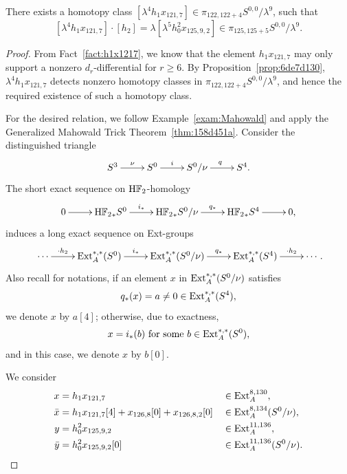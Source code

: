 \documentclass{amsart}
\numberwithin{equation}{section}
\newcommand{\HF}{\mathrm{H}\bF_2}
\begin{document}
\begin{lemma} \label{lem:nuext125}
    There exists a homotopy class $[\lambda^4 h_1 x_{121,7}] \in \pi_{122,122+4}S^{0,0}/\lambda^9$, such that 
    $$[\lambda^4 h_1 x_{121,7}] \cdot [h_2] = \lambda [\lambda^5 h_0^2 x_{125,9,2}] \in \pi_{125,125+5} S^{0,0}/\lambda^9.$$
\end{lemma}

\begin{proof}
    From Fact~\ref{fact:h1x1217}, we know that the element $h_1x_{121,7}$ may only support a nonzero $d_r$-differential for $r \ge 6$. By Proposition~\ref{prop:6de7d130}, $\lambda^4 h_1 x_{121,7}$ detects nonzero homotopy classes in $\pi_{122,122+4}S^{0,0}/\lambda^9$, and hence the required existence of such a homotopy class.

    For the desired relation, we follow Example~\ref{exam:Mahowald} and apply the Generalized Mahowald Trick Theorem~\ref{thm:158d451a}. Consider the distinguished triangle
        $$\xymatrix{S^3 \ar[r]^{\nu} & S^0 \ar[r]^-{i} & S^0/\nu \ar[r]^{q} & S^4.}$$
The short exact sequence on $\HF$-homology
$$\xymatrix{0 \ar[r] & {\HF}_*S^0 \ar[r]^-{i_*} & {\HF}_*S^0/\nu \ar[r]^-{q_*} & {\HF}_*S^4 \ar[r] & 0,}$$
induces a long exact sequence on Ext-groups
$$\xymatrix{\cdots \ar[r]^-{\cdot h_2} & {\Ext}_A^{*,*}(S^0) \ar[r]^-{i_*} & {\Ext}_A^{*,*}(S^0/\nu) \ar[r]^-{q_*} & {\Ext}_A^{*,*}(S^4) \ar[r]^-{\cdot h_2} & \cdots}.$$
Also recall for notations, if an element $x$ in ${\mathrm{Ext}}_A^{*,*}(S^0/\nu)$ satisfies 
$$q_*(x) = a \neq 0 \in \mathrm{Ext}_A^{*,*}(S^4),$$ 
we denote $x$ by $a[4]$; otherwise, due to exactness, 
$$x = i_*(b) \ \text{for some} \ b \in \Ext_A^{*,*}(S^0),$$
and in this case, we denote $x$ by $b[0]$. 

We consider
\begin{align*}
x & = h_1 x_{121,7} && \in \mathrm{Ext}_A^{8,130},\\
\bar{x} & =h_1 x_{121,7} [4] + x_{126,8}[0] + x_{126,8,2}[0] && \in \mathrm{Ext}_A^{8,134}(S^0/\nu), \\
y & =h_0^2 x_{125,9,2} && \in \mathrm{Ext}_A^{11,136} ,\\
        \bar{y} & =h_0^2 x_{125,9,2}[0] && \in \mathrm{Ext}_A^{11,136}(S^0/\nu). 
  \end{align*}      


\end{proof}
\end{document}
